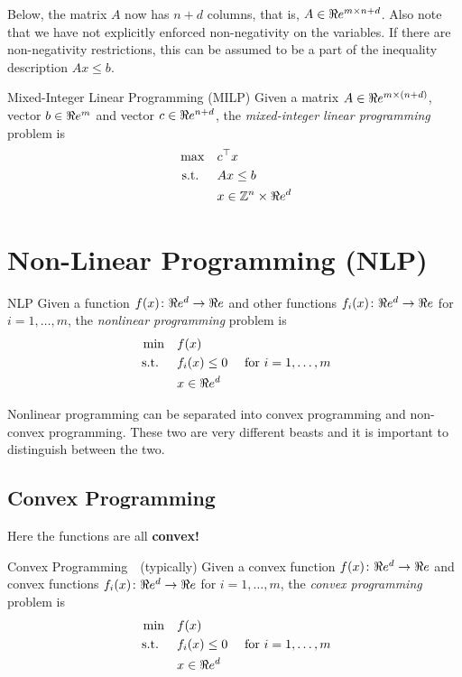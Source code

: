 Below, the matrix $A$ now has $n+d$ columns, that is, $A \in \Re e^{m \times n+d}$.  Also note that we have not explicitly enforced non-negativity on the variables.  If there are non-negativity restrictions, this can be assumed to be a part of the inequality description $Ax \leq b$.
\begin{general}{Mixed-Integer Linear Programming (MILP)}{\npcomplete}
Given a matrix $A \in \Re e^{m\times (n+d)}$, vector $b \in \Re e^m$ and vector $c \in \Re e^{n+d}$, the \emph{mixed-integer linear programming} problem is
\begin{equation}
\label{eq:ILP}
\begin{split}
\max \quad & c^\top x\\
\mbox{ s.t. }  \quad & Ax \leq b\\
& x \in {\mathbb{Z}}^n \times \Re e^d
\end{split}
\end{equation}
\end{general}

\section{Non-Linear Programming (NLP)}
\begin{general}{NLP}{\nphard}
Given a function $f(x)\colon \Re e^d \to \Re e$ and other functions $f_i(x)\colon \Re e^d \to \Re e$ for $i=1, \dots, m$,  the \emph{nonlinear programming} problem is
\begin{equation}
\label{eq:convex-programming}
\begin{split}
\min \quad & f(x)\\
\mbox{ s.t. }  \quad & f_i(x) \leq 0  \quad  \mbox{ for } i=1, \dots, m\\
& x \in \Re e^d
\end{split}
\end{equation}
\end{general}


Nonlinear programming can be separated into convex programming and non-convex programming.  These two are very different beasts and it is important to distinguish between the two.
\subsection{Convex Programming}
Here the functions are all \textbf{convex!}
\begin{general}{Convex Programming}{\polynomial\ \  (typically)}
Given a convex function $f(x)\colon \Re e^d \to \Re e$ and convex functions $f_i(x)\colon \Re e^d \to \Re e$ for $i=1, \dots, m$,  the \emph{convex programming} problem is
\begin{equation}
\label{eq:convex-programming}
\begin{split}
\min \quad & f(x)\\
\mbox{ s.t. }  \quad & f_i(x) \leq 0  \quad  \mbox{ for } i=1, \dots, m\\
& x \in \Re e^d
\end{split}
\end{equation}
\end{general}

